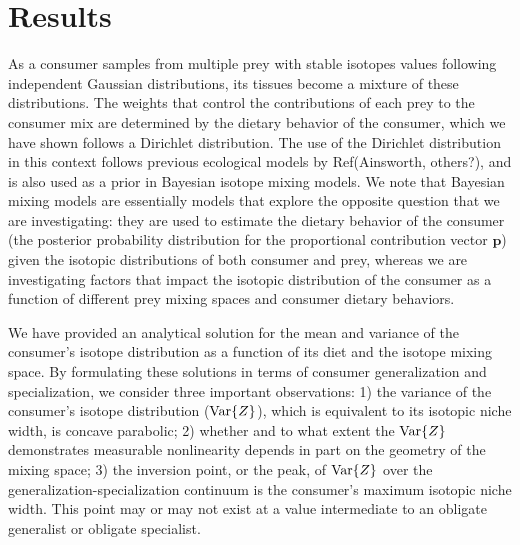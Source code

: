 \documentclass{frontiersSCNS}
\begin{document}
\section{Results}

As a consumer samples from multiple prey with stable isotopes values following independent Gaussian distributions, its tissues become a mixture of these distributions.
The weights that control the contributions of each prey to the consumer mix are determined by the dietary behavior of the consumer, which we have shown follows a Dirichlet distribution.
The use of the Dirichlet distribution in this context follows previous ecological models by Ref(Ainsworth, others?), and is also used as a prior in Bayesian isotope mixing models.
We note that Bayesian mixing models are essentially models that explore the opposite question that we are investigating: they are used to estimate the dietary behavior of the consumer (the posterior probability distribution for the proportional contribution vector $\bm p$) given the isotopic distributions of both consumer and prey, whereas we are investigating factors that impact the isotopic distribution of the consumer as a function of different prey mixing spaces and consumer dietary behaviors.


We have provided an analytical solution for the mean and variance of the consumer's isotope distribution as a function of its diet and the isotope mixing space.
By formulating these solutions in terms of consumer generalization and specialization, we consider three important observations:
1) the variance of the consumer's isotope distribution (${\rm Var}\{Z\}$), which is equivalent to its isotopic niche width, is concave parabolic;
2) whether and to what extent the ${\rm Var}\{Z\}$ demonstrates measurable nonlinearity depends in part on the geometry of the mixing space;
3) the inversion point, or the peak, of ${\rm Var}\{Z\}$ over the generalization-specialization continuum is the consumer's maximum isotopic niche width.
This point may or may not exist at a value intermediate to an obligate generalist or obligate specialist.



\end{document}
